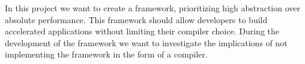 In this project we want to create a framework, prioritizing high abstraction over absolute performance. This framework should allow developers to build accelerated applications without limiting their compiler choice. During the development of the framework we want to investigate the implications of not implementing the framework in the form of a compiler.


